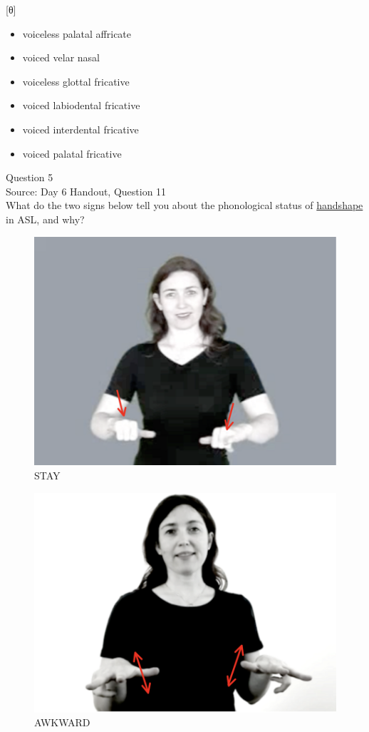 \documentclass[12pt]{article}
\begin{document}
{[θ]}

\begin{itemize} \item voiceless palatal affricate \item voiced velar nasal \item voiceless glottal fricative \item voiced labiodental fricative \item voiced interdental fricative \item voiced palatal fricative \end{itemize}


\newpage

{\large Question 5}\\

Source: Day 6 Handout, Question 11\\

What do the two signs below tell you about the phonological status of \underline{handshape} in ASL, and why?\\

\begin{figure}[H]
\includegraphics{../images/asl_stay.png}
\caption{STAY}
\end{figure}
\begin{figure}[H]
\includegraphics{../images/asl_awkward.png}
\caption{AWKWARD}
\end{figure}
\end{document}
